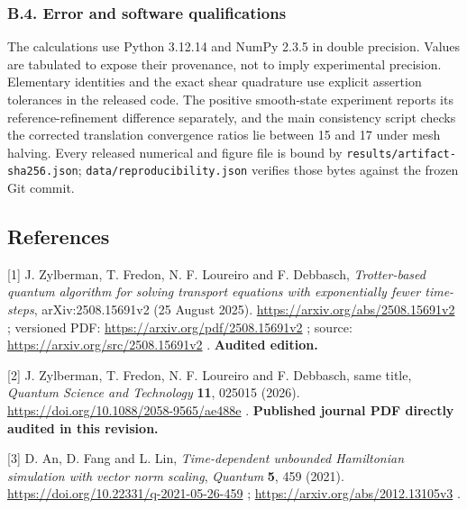 \subsubsection{B.4. Error and software
qualifications}\label{b.4.-error-and-software-qualifications}

The calculations use Python 3.12.14 and NumPy 2.3.5 in double precision.
Values are tabulated to expose their provenance, not to imply
experimental precision. Elementary identities and the exact shear
quadrature use explicit assertion tolerances in the released code. The
positive smooth-state experiment reports its reference-refinement
difference separately, and the main consistency script checks the
corrected translation convergence ratios lie between 15 and 17 under
mesh halving. Every released numerical and figure file is bound by
\nolinkurl{results/artifact-sha256.json};
\nolinkurl{data/reproducibility.json} verifies those bytes against the
frozen Git commit.

\subsection{References}\label{references}

\begingroup\small
\begin{samepage}
{[}1{]} J. Zylberman, T. Fredon, N. F. Loureiro and F. Debbasch,
\emph{Trotter-based quantum algorithm for solving transport equations
with exponentially fewer time-steps}, arXiv:2508.15691v2 (25 August
2025). \url{https://arxiv.org/abs/2508.15691v2} ; versioned PDF:
\url{https://arxiv.org/pdf/2508.15691v2} ; source:
\url{https://arxiv.org/src/2508.15691v2} . \textbf{Audited edition.}
\end{samepage}

\begin{samepage}
{[}2{]} J. Zylberman, T. Fredon, N. F. Loureiro and F. Debbasch, same
title, \emph{Quantum Science and Technology} \textbf{11}, 025015 (2026).
\url{https://doi.org/10.1088/2058-9565/ae488e} . \textbf{Published
journal PDF directly audited in this revision.}
\end{samepage}

\begin{samepage}
{[}3{]} D. An, D. Fang and L. Lin, \emph{Time-dependent unbounded
Hamiltonian simulation with vector norm scaling}, \emph{Quantum}
\textbf{5}, 459 (2021). \url{https://doi.org/10.22331/q-2021-05-26-459}
; \url{https://arxiv.org/abs/2012.13105v3} .
\end{samepage}

